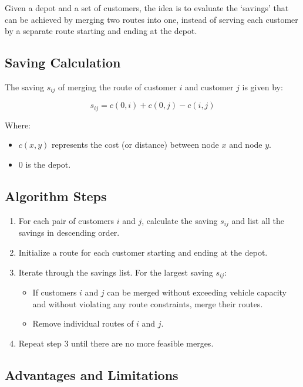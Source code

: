 Given a depot and a set of customers, the idea is to evaluate the `savings' that can be achieved by merging two routes into one, instead of serving each customer by a separate route starting and ending at the depot.

\subsection{Saving Calculation}

The saving \(s_{ij}\) of merging the route of customer \(i\) and customer \(j\) is given by:

\begin{equation}
s_{ij} = c(0, i) + c(0, j) - c(i, j)
\end{equation}

Where:
\begin{itemize}
    \item \(c(x, y)\) represents the cost (or distance) between node \(x\) and node \(y\).
    \item \(0\) is the depot.
\end{itemize}

\subsection{Algorithm Steps}

\begin{enumerate}
    \item For each pair of customers \(i\) and \(j\), calculate the saving \(s_{ij}\) and list all the savings in descending order.
    \item Initialize a route for each customer starting and ending at the depot.
    \item Iterate through the savings list. For the largest saving \(s_{ij}\):
    \begin{itemize}
        \item If customers \(i\) and \(j\) can be merged without exceeding vehicle capacity and without violating any route constraints, merge their routes.
        \item Remove individual routes of \(i\) and \(j\).
    \end{itemize}
    \item Repeat step 3 until there are no more feasible merges.
\end{enumerate}

\subsection{Advantages and Limitations}

